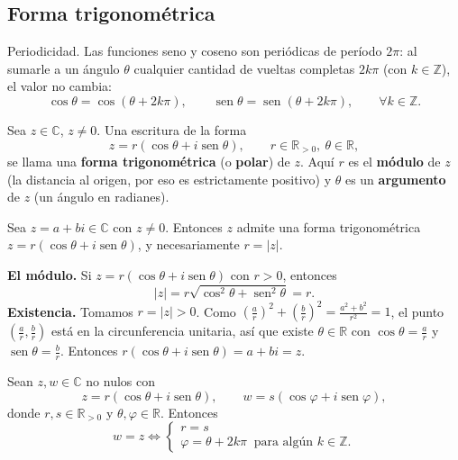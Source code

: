 \subsection{Forma trigonométrica}
\begin{nota}{Periodicidad.}
Las funciones seno y coseno son periódicas de período
$2\pi$: al sumarle a un ángulo $\theta$ cualquier cantidad de vueltas completas
$2k\pi$ (con $k\in\mathbb{Z}$), el valor no cambia:
\[
\cos\theta=\cos(\theta+2k\pi), \qquad
\operatorname{sen}\theta=\operatorname{sen}(\theta+2k\pi), \qquad \forall k\in\mathbb{Z}.
\]
\end{nota}
\begin{definicion}
Sea $z\in\mathbb{C}$, $z\neq 0$. Una escritura de la forma
\[
z=r(\cos\theta+i\operatorname{sen}\theta), \qquad r\in\mathbb{R}_{>0},\ \theta\in\mathbb{R},
\]
se llama una \textbf{forma trigonométrica} (o \textbf{polar}) de $z$. Aquí $r$ es
el \textbf{módulo} de $z$ (la distancia al origen, por eso es estrictamente
positivo) y $\theta$ es un \textbf{argumento} de $z$ (un ángulo en radianes).
\end{definicion}
\begin{proposicion}
Sea $z=a+bi\in\mathbb{C}$ con $z\neq 0$. Entonces $z$ admite una forma
trigonométrica $z=r(\cos\theta+i\operatorname{sen}\theta)$, y necesariamente
$r=|z|$.
\end{proposicion}
\begin{demostracion}
\textbf{El módulo.} Si $z=r(\cos\theta+i\operatorname{sen}\theta)$ con $r>0$, entonces
\[
|z|=r\sqrt{\cos^2\theta+\operatorname{sen}^2\theta}=r.
\]
\textbf{Existencia.} Tomamos $r=|z|>0$. Como
$\left(\tfrac{a}{r}\right)^2+\left(\tfrac{b}{r}\right)^2=\tfrac{a^2+b^2}{r^2}=1$,
el punto $\left(\tfrac{a}{r},\tfrac{b}{r}\right)$ está en la circunferencia
unitaria, así que existe $\theta\in\mathbb{R}$ con $\cos\theta=\tfrac{a}{r}$ y
$\operatorname{sen}\theta=\tfrac{b}{r}$. Entonces
$r(\cos\theta+i\operatorname{sen}\theta)=a+bi=z$.
\end{demostracion}
\begin{proposicion}[{title={Igualdad en forma trigonométrica}}]
Sean $z,w\in\mathbb{C}$ no nulos con
\[
z=r(\cos\theta+i\operatorname{sen}\theta), \qquad
w=s(\cos\varphi+i\operatorname{sen}\varphi),
\]
donde $r,s\in\mathbb{R}_{>0}$ y $\theta,\varphi\in\mathbb{R}$. Entonces
\[
w=z \iff
\begin{cases}
r=s\\
\varphi=\theta+2k\pi \ \text{ para algún } k\in\mathbb{Z}.
\end{cases}
\]
\end{proposicion}
